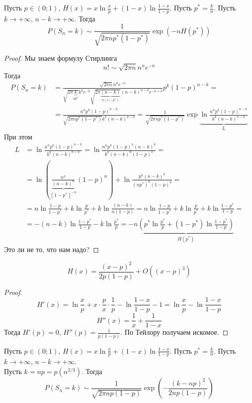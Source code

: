 \documentclass{article}
\begin{document}
    \begin{lemma}
        Пусть $p\in(0;1)$, $H(x)=x\ln\frac xp+(1-x)\ln\frac{1-x}{1-p}$. Пусть $p^*=\frac kn$. Пусть $k\rightarrow+\infty$, $n-k\rightarrow+\infty$. Тогда
        $$
        P(S_n=k)\sim\frac1{\sqrt{2\pi np^*(1-p^*)}}\exp(-nH(p^*))
        $$
    \end{lemma}
    \begin{proof}
        Мы знаем формулу Стирлинга
        $$
        n!\sim\sqrt{2\pi n}n^ne^{-n}
        $$
        Тогда
        \[\begin{split}
            P(S_n=k)&=\frac{\sqrt{2\pi n}n^ne^{-n}}{\sqrt{2\pi\underbrace{k}_{np^*}}k^ke^{-k}\sqrt{2\pi\underbrace{(n-k)}_{n(1-p^*)}}(n-k)^{n-k}e^{-n+k}}p^k(1-p)^{n-k}=\\
            &=\frac{n^np^k(1-p)^{n-k}}{\sqrt{2\pi np^*(1-p^*)}k^k(n-k)^{n-k}}=\frac1{\sqrt{2\pi np^*(1-p^*)}}\exp\underbrace{\ln\frac{n^np^k(1-p)^{n-k}}{k^k(n-k)^{n-k}}}_L
        \end{split}\]
        При этом
        \[\begin{split}
            L&=\ln\frac{n^np^k(1-p)^{n-k}}{k^k(n-k)^{n-k}}=\ln\frac{n^np^k(1-p)^n(n-k)^k}{k^k(n-k)^n(1-p)^k}=\\
            &=\ln\left(\underbrace{\frac{n^n}{(n-k)^n}}_{(1-p^*)^{-n}}(1-p)^n\right)+\ln\frac{p^k(n-k)^k}{(np^*)^k(1-p)^k}=\\
            &=n\ln\frac{1-p}{1-p^*}+k\ln\frac{p}{p^*}+k\ln\frac{(n-k)}{n(1-p)}=n\ln\frac{1-p}{1-p^*}+k\ln\frac{p}{p^*}+k\ln\frac{1-p^*}{1-p}=\\
            &=-(n-k)\ln\frac{1-p^*}{1-p}-k\ln\frac{p^*}{p}=-n\underbrace{\left(p^*\ln\frac{p^*}{p}+(1-p^*)\ln\frac{1-p^*}{1-p}\right)}_{H(p^*)}
        \end{split}\]
        Это ли не то, что нам надо?
    \end{proof}
    \begin{lemma}
        $$
        H(x)=\frac{(x-p)^2}{2p(1-p)}+O((x-p)^3)
        $$
    \end{lemma}
    \begin{proof}
        $$
        H'(x)=\ln\frac xp+x\cdot\frac px\cdot\frac1p-\ln\frac{1-x}{1-p}-1=\ln\frac xp-\ln\frac{1-x}{1-p}
        $$
        $$
        H''(x)=\frac1x+\frac1{1-x}
        $$
        Тогда $H'(p)=0$, $H''(p)=\frac1{p(1-p)}$. По Тейлору получаем искомое.
    \end{proof}
    \begin{theorem}
        Пусть $p\in(0;1)$, $H(x)=x\ln\frac xp+(1-x)\ln\frac{1-x}{1-p}$. Пусть $p^*=\frac kn$. Пусть $k\rightarrow+\infty$, $n-k\rightarrow+\infty$.\\
        Пусть $k=np=p(n^{2/3})$. Тогда
        $$
        P(S_n=k)\sim\frac1{\sqrt{2\pi np(1-p)}}\exp\left(-\frac{(k-np)^2}{2np(1-p)}\right)
        $$
    \end{theorem}
\end{document}
